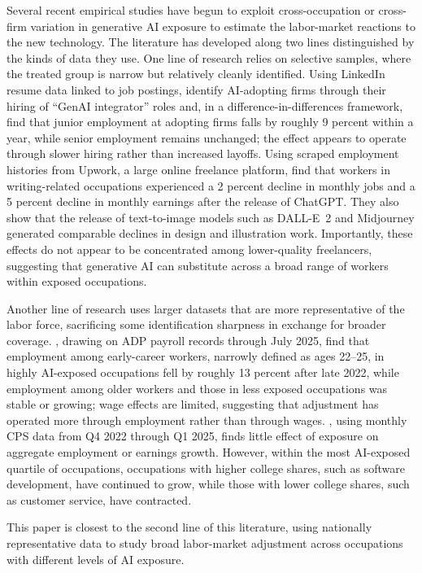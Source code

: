\documentclass[11pt]{article}
\theoremstyle{plain}
\theoremstyle{remark}
\begin{document}
Several recent empirical studies have begun to exploit cross-occupation or cross-firm variation in generative AI exposure to estimate the labor-market reactions to the new technology.  The literature has developed along two lines distinguished by the kinds of data they use.  One line of research relies on selective samples, where the treated group is narrow but relatively cleanly identified. Using LinkedIn resume data linked to job postings, \textcite{hosseini2025seniority} identify AI-adopting firms through their hiring of ``GenAI integrator'' roles and, in a difference-in-differences framework, find that junior employment at adopting firms falls by roughly 9 percent within a year, while senior employment remains unchanged; the effect appears to operate through slower hiring rather than increased layoffs. Using scraped employment histories from Upwork, a large online freelance platform, \textcite{hui2024short} find that workers in writing-related occupations experienced a 2 percent decline in monthly jobs and a 5 percent decline in monthly earnings after the release of ChatGPT. They also show that the release of text-to-image models such as DALL-E~2 and Midjourney generated comparable declines in design and illustration work. Importantly, these effects do not appear to be concentrated among lower-quality freelancers, suggesting that generative AI can substitute across a broad range of workers within exposed occupations.

Another line of research uses larger datasets that are more representative of the labor force, sacrificing some identification sharpness in exchange for broader coverage. \textcite{brynjolfsson2025canaries}, drawing on ADP payroll records through July 2025, find that employment among early-career workers, narrowly defined as ages 22--25, in highly AI-exposed occupations fell by roughly 13 percent after late 2022, while employment among older workers and those in less exposed occupations was stable or growing; wage effects are limited, suggesting that adjustment has operated more through employment rather than through wages. \textcite{chandar2025tracking}, using monthly CPS data from Q4 2022 through Q1 2025, finds little effect of exposure on aggregate employment or earnings growth. However, within the most AI-exposed quartile of occupations, occupations with higher college shares, such as software development, have continued to grow, while those with lower college shares, such as customer service, have contracted. 

This paper is closest to the second line of this literature, using nationally representative data to study broad labor-market adjustment across occupations with different levels of AI exposure.
\end{document}
